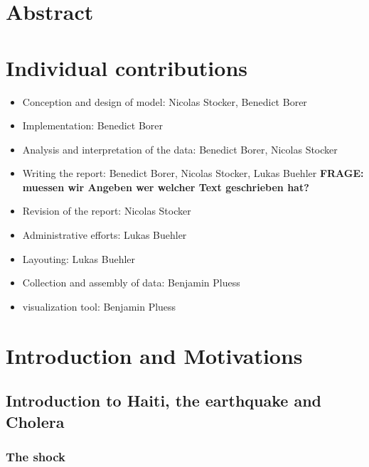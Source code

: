 \documentclass[11pt]{article}
\begin{document}
\section{Abstract}

\section{Individual contributions}

\begin{itemize}
\item Conception and design of model: Nicolas Stocker, Benedict Borer
\item Implementation: Benedict Borer
\item Analysis and interpretation of the data: Benedict Borer, Nicolas Stocker
\item Writing the report: Benedict Borer, Nicolas Stocker, Lukas Buehler \textbf{FRAGE: muessen wir Angeben wer welcher Text geschrieben hat?}
\item Revision of the report: Nicolas Stocker
\item Administrative efforts: Lukas Buehler
\item Layouting: Lukas Buehler
\item Collection and assembly of data: Benjamin Pluess
\item visualization tool: Benjamin Pluess

\end{itemize}













\section{Introduction and Motivations}
\subsection{Introduction to Haiti, the earthquake and Cholera }
\subsubsection*{The shock}
\end{document}
